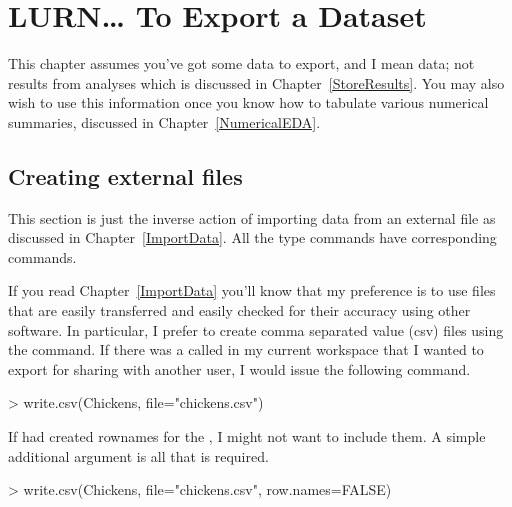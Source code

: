 

\chapter{LURN\ldots{} To Export a Dataset} 
\label{ExportData} 
 

 
This chapter assumes you've got some data to export, and I mean data; not results from analyses which is discussed in Chapter~\ref{StoreResults}. You may also wish to use this information once you know how to tabulate various numerical summaries, discussed in Chapter~\ref{NumericalEDA}. 
 
\section{Creating external files} 
 
This section is just the inverse action of importing data from an external file as discussed in Chapter~\ref{ImportData}. All the  type commands have corresponding  commands. 
 
If you read Chapter~\ref{ImportData} you'll know that my preference is to use files that are easily transferred and easily checked for their accuracy using other software. In particular, I prefer to create comma separated value (csv) files using the  command. If there was a  called  in my current workspace that I wanted to export for sharing with another user, I would issue the following command. 

\begin{Schunk}
\begin{Sinput}
> write.csv(Chickens, file="chickens.csv") 
\end{Sinput}
\end{Schunk}

If \R{} had created rownames for the , I might not want to include them. A simple additional argument is all that is required. 

\begin{Schunk}
\begin{Sinput}
> write.csv(Chickens, file="chickens.csv", row.names=FALSE) 
\end{Sinput}
\end{Schunk}

